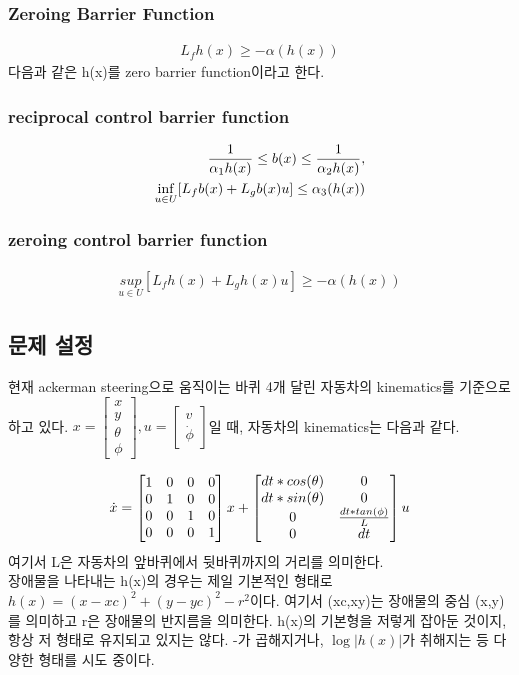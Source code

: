 \documentclass[journal]{IEEEtran}
\begin{document}
\subsubsection{Zeroing Barrier Function}
\begin{align}
	L_fh(x)\geq-\alpha(h(x))	
	\label{eq:zero_barrier_function}
\end{align}
다음과 같은 h(x)를 zero barrier function이라고 한다. 

\subsubsection{reciprocal control barrier function}
\begin{align}
	{1 \over{\alpha_1h(x)}}\leq b(x)\leq{{1 \over{\alpha_2h(x)}}},\nonumber\\
	\underset{u\in U}{\inf}[L_fb(x)+L_gb(x)u]\leq \alpha_3(h(x))
\end{align}

\subsubsection{zeroing control barrier function }
\begin{align}
	\underset{u\in U}{sup}[L_fh(x)+L_gh(x)u]\geq -\alpha(h(x))
\end{align}


\subsection{문제 설정}
현재 ackerman steering으로 움직이는 바퀴 4개 달린 자동차의 kinematics를 기준으로 하고 있다. 
$x=\begin{bmatrix*} x\\y\\\theta\\\phi \end{bmatrix*},u=\begin{bmatrix*}v\\\dot{\phi} \end{bmatrix*}$일 때,
자동차의 kinematics는 다음과 같다.

\begin{align}
	\dot{x}=\begin{bmatrix} 1&0&0&0\\0&1&0&0\\0&0&1&0\\0&0&0&1 \end{bmatrix}x+
	\begin{bmatrix} dt*cos(\theta)&0 \\dt*sin(\theta)& 0 \\0& {dt*tan(\phi) \over L}\\ 0 &dt \end{bmatrix}u
	\label{eq:kinematics}
\end{align}
여기서 L은 자동차의 앞바퀴에서 뒷바퀴까지의 거리를 의미한다.  \\
장애물을 나타내는 h(x)의 경우는 제일 기본적인 형태로 $h(x)=(x-xc)^2+(y-yc)^2-r^2$이다. 여기서 (xc,xy)는 장애물의 중심 (x,y)를 의미하고 r은 장애물의 반지름을 의미한다. h(x)의 기본형을 저렇게 잡아둔 것이지, 항상 저 형태로 유지되고 있지는 않다. -가 곱해지거나, $\log{\lvert h(x) \rvert}$가 취해지는 등 다양한 형태를 시도 중이다.
 
\end{document}
